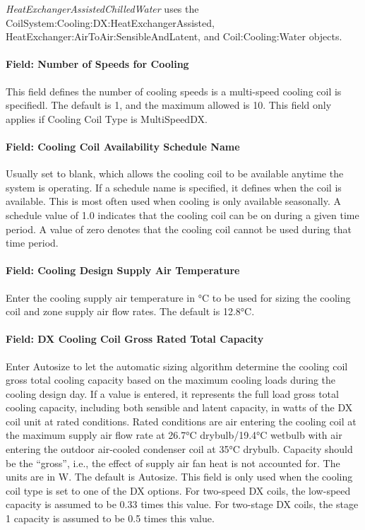 \emph{HeatExchangerAssistedChilledWater} uses the CoilSystem:Cooling:DX:HeatExchangerAssisted, HeatExchanger:AirToAir:SensibleAndLatent, and Coil:Cooling:Water objects.

\paragraph{Field: Number of Speeds for Cooling}\label{field-number-of-speeds-for-cooling}

This field defines the number of cooling speeds is a multi-speed cooling coil is specifiedl. The default is 1, and the maximum allowed is 10. This field only applies if Cooling Coil Type is MultiSpeedDX.

\paragraph{Field: Cooling Coil Availability Schedule Name}\label{field-cooling-coil-availability-schedule-name-6}

Usually set to blank, which allows the cooling coil to be available anytime the system is operating. If a schedule name is specified, it defines when the coil is available. This is most often used when cooling is only available seasonally. A schedule value of 1.0 indicates that the cooling coil can be on during a given time period. A value of zero denotes that the cooling coil cannot be used during that time period.

\paragraph{Field: Cooling Design Supply Air Temperature}\label{field-cooling-design-supply-air-temperature-2}

Enter the cooling supply air temperature in °C to be used for sizing the cooling coil and zone supply air flow rates. The default is 12.8°C.

\paragraph{Field: DX Cooling Coil Gross Rated Total Capacity}\label{field-dx-cooling-coil-gross-rated-total-capacity}

Enter Autosize to let the automatic sizing algorithm determine the cooling coil gross total cooling capacity based on the maximum cooling loads during the cooling design day. If a value is entered, it represents the full load gross total cooling capacity, including both sensible and latent capacity, in watts of the DX coil unit at rated conditions. Rated conditions are air entering the cooling coil at the maximum supply air flow rate at 26.7°C drybulb/19.4°C wetbulb with air entering the outdoor air-cooled condenser coil at 35°C drybulb. Capacity should be the ``gross'', i.e., the effect of supply air fan heat is not accounted for. The units are in W. The default is Autosize. This field is only used when the cooling coil type is set to one of the DX options. For two-speed DX coils, the low-speed capacity is assumed to be 0.33 times this value. For two-stage DX coils, the stage 1 capacity is assumed to be 0.5 times this value.

